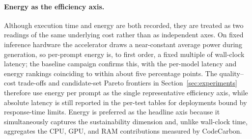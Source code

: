 \paragraph{Energy as the efficiency axis.}
Although execution time and energy are both recorded, they are treated as
two readings of the same underlying cost rather than as independent axes.
On fixed inference hardware the accelerator draws a near-constant average
power during generation, so per-prompt energy is, to first order, a fixed
multiple of wall-clock latency; the baseline campaign confirms this, with
the per-model latency and energy rankings coinciding to within about five
percentage points. The quality--cost trade-offs and candidate-set Pareto
frontiers in
Section~\ref{sec:experiments} therefore use energy per prompt as the single
representative efficiency axis, while absolute latency is still reported in
the per-test tables for deployments bound by response-time limits. Energy
is preferred as the headline axis because it simultaneously captures the
sustainability dimension and, unlike wall-clock time, aggregates the CPU,
GPU, and RAM contributions measured by CodeCarbon.


